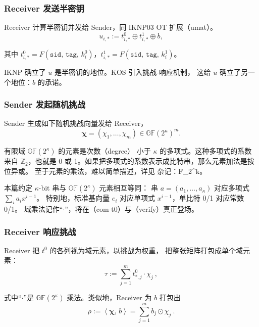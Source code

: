 \subsubsection{Receiver 发送半密钥}

Receiver 计算半密钥并发给 Sender，同 IKNP03 OT 扩展（umat）。
\begin{equation}\label{eq:02-kos15:umat}
u_{i,*} := t^0_{i,*} \oplus t^1_{i,*} \oplus b, \tag{umat}
\end{equation}

其中 $t^0_{i,*}=F\left(\mathtt{sid},\,\mathtt{tag},\,k^0_i\right)$，$t^1_{i,*}=F\left(\mathtt{sid},\,\mathtt{tag},\,k^1_i\right)$。

IKNP 确立了 $u$ 是半密钥的地位。KOS 引入挑战-响应机制，
这给 $u$ 确立了另一个地位：$b$ 的承诺。

\subsubsection{Sender 发起随机挑战}

Sender 生成如下随机挑战向量发给 Receiver，
\begin{equation}\label{eq:02-kos15:chal}
\boldsymbol{\chi} = \left(\chi_1, \ldots, \chi_m\right)
\in \mathbb{GF}(2^\kappa)^m. \tag{chal}
\end{equation}

有限域 $\mathbb{GF}(2^\kappa)$ 的元素是次数（degree）
小于 $\kappa$ 的多项式。这种多项式的系数来自 $\mathbb{Z}_2$，也就是 0
或 1。如果把多项式的系数表示成比特串，那么元素加法是按位异或。
至于元素的乘法，难以简单描述，详见 杂记：F\_2\^{}k。

本篇约定 $\kappa$-bit 串与 $\mathbb{GF}(2^\kappa)$ 元素相互等同：
串 $a = (a_1, \ldots, a_\kappa)$ 对应多项式 $\sum_i a_i x^{i-1}$。
特别地，标准基向量 $e_i$ 对应单项式 $x^{i-1}$，单比特 0/1 对应常数 0/1。
域乘法记作“$\cdot$”，将在（com-t0）与（verify）真正登场。

\subsubsection{Receiver 响应挑战}

Receiver 把 $t^0$ 的各列视为域元素，以挑战为权重，
把整张矩阵打包成单个域元素：
\begin{equation}\label{eq:02-kos15:com-t0}
\tau := \sum_{j=1}^{m} t^0_{*,j} \cdot \chi_j ~, \tag{com-t0}
\end{equation}

式中“$\cdot$”是 $\mathbb{GF}(2^\kappa)$ 乘法。类似地，Receiver
为 $b$ 打包出
\begin{equation}\label{eq:02-kos15:com-b}
\rho := \left<\boldsymbol{\chi},\, b\right>
=\sum_{j=1}^{m} b_j \odot \chi_j ~. \tag{com-b}
\end{equation}

